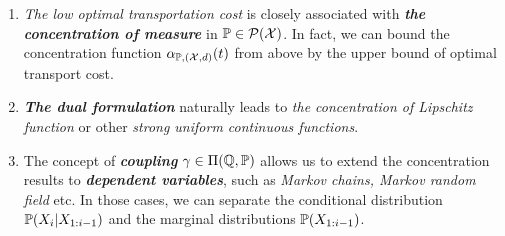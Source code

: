\documentclass[11pt]{article}
\begin{document}
\begin{enumerate}
\begin{remark}
\begin{enumerate}
\item  \emph{The low optimal transportation cost}  is closely associated with \emph{\textbf{the concentration of measure}} in ${\mathbb P} \in {\mathcal P}({\mathcal X})$. In fact, we can bound the concentration function $\alpha_{{\mathbb P}, ({\mathcal X}, d)}(t)$ from above by the upper bound of optimal transport cost.

\item \emph{\textbf{The dual formulation}} naturally leads to \emph{the concentration of Lipschitz function} or other \emph{strong uniform continuous functions}.

\item The concept of \emph{\textbf{coupling}} $\gamma \in \Pi({\mathbb Q}, {\mathbb P})$ allows us to extend the concentration results to \emph{\textbf{dependent variables}}, such as \emph{Markov chains, Markov random field} etc. In those cases, we can separate the conditional distribution ${\mathbb P}(X_{i} | X_{1:i-1})$  and the marginal distributions ${\mathbb P}(X_{1:i-1})$.
\end{enumerate}
\end{remark}
\end{enumerate}


\newpage
\end{document}
